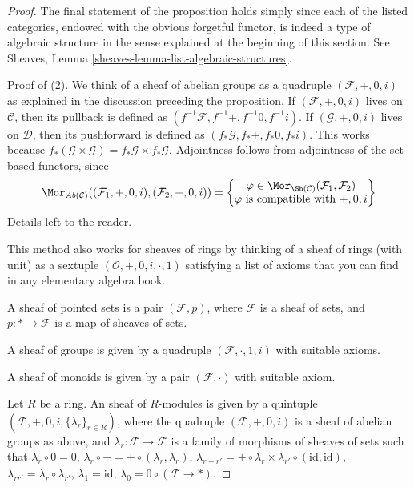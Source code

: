 \begin{proof}
The final statement of the proposition holds simply since each of the listed
categories, endowed with the obvious forgetful functor, is indeed a type of
algebraic structure in the sense explained at the beginning of this section.
See Sheaves, Lemma \ref{sheaves-lemma-list-algebraic-structures}.

\medskip\noindent
Proof of (2). We think of a sheaf of abelian groups as
a quadruple $(\mathcal{F}, +, 0, i)$ as explained in the discussion preceding
the proposition.
If $(\mathcal{F}, +, 0, i)$ lives on $\mathcal{C}$, then its pullback
is defined as $(f^{-1}\mathcal{F}, f^{-1}+, f^{-1}0, f^{-1}i)$.
If $(\mathcal{G}, +, 0, i)$ lives on $\mathcal{D}$, then its pushforward
is defined as $(f_*\mathcal{G}, f_*+, f_*0, f_*i)$. This works because
$f_*(\mathcal{G} \times \mathcal{G}) = f_*\mathcal{G} \times f_*\mathcal{G}$.
Adjointness follows from adjointness of the set based functors,
since
$$
\Mor_{\textit{Ab}(\mathcal{C})}
((\mathcal{F}_1, +, 0, i), (\mathcal{F}_2, +, 0, i))
=
\left\{
\begin{matrix}
\varphi \in \Mor_{\Sh(\mathcal{C})}
(\mathcal{F}_1, \mathcal{F}_2) \\
\varphi \text{ is compatible with }+, 0, i
\end{matrix}
\right\}
$$
Details left to the reader.

\medskip\noindent
This method also works for sheaves of rings by thinking
of a sheaf of rings (with unit) as a sextuple
$(\mathcal{O}, + , 0, i, \cdot, 1)$ satisfying a list
of axioms that you can find in any elementary
algebra book.

\medskip\noindent
A sheaf of pointed sets is a pair $(\mathcal{F}, p)$, where
$\mathcal{F}$ is a sheaf of sets, and $p : * \to \mathcal{F}$
is a map of sheaves of sets.

\medskip\noindent
A sheaf of groups is given by a quadruple $(\mathcal{F}, \cdot, 1, i)$
with suitable axioms.

\medskip\noindent
A sheaf of monoids is given by a pair $(\mathcal{F}, \cdot)$
with suitable axiom.

\medskip\noindent
Let $R$ be a ring. An sheaf of $R$-modules is given by
a quintuple $(\mathcal{F}, +, 0, i, \{\lambda_r\}_{r \in R})$,
where the quadruple $(\mathcal{F}, +, 0, i)$ is a sheaf of
abelian groups as above, and $\lambda_r : \mathcal{F} \to \mathcal{F}$
is a family of morphisms of sheaves of sets
such that
$\lambda_r \circ 0 = 0$,
$\lambda_r \circ + = + \circ (\lambda_r, \lambda_r)$,
$\lambda_{r + r'} =
+ \circ \lambda_r \times \lambda_{r'} \circ (\text{id}, \text{id})$,
$\lambda_{rr'} = \lambda_r \circ \lambda_{r'}$,
$\lambda_1 = \text{id}$, $\lambda_0 = 0 \circ (\mathcal{F} \to *)$.
\end{proof}

